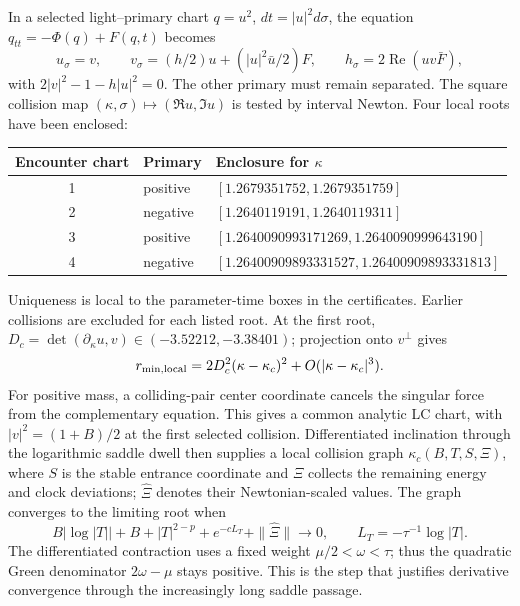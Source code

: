 In a selected light--primary chart $q=u^2$, $dt=|u|^2d\sigma$,
the equation $q_{tt}=-\Phi(q)+F(q,t)$ becomes
\[
 u_\sigma=v,\qquad
 v_\sigma=(h/2)u+(|u|^2\bar u/2)F,\qquad
 h_\sigma=2\operatorname{Re}(uv\bar F),
\]
with $2|v|^2-1-h|u|^2=0$. The other primary must remain separated.
The square collision map $(\kappa,\sigma)\mapsto(\Re u,\Im u)$
is tested by interval Newton. Four local roots have been enclosed:
\begin{center}
\small
\begin{tabular}{cll}
\toprule
Encounter chart & Primary & Enclosure for $\kappa$\\
\midrule
1 & positive & $[1.2679351752,1.2679351759]$\\
2 & negative & $[1.2640119191,1.2640119311]$\\
3 & positive & $[1.2640090993171269,1.2640090999643190]$\\
4 & negative & $[1.26400909893331527,1.26400909893331813]$\\
\bottomrule
\end{tabular}
\end{center}
Uniqueness is local to the parameter-time boxes in the certificates.
Earlier collisions are excluded for each listed root. At the first root,
$D_c=\det(\partial_\kappa u,v)\in(-3.52212,-3.38401)$; projection
onto $v^\perp$ gives
\[
 r_{\min,\rm local}=2D_c^2(\kappa-\kappa_c)^2
 +O(|\kappa-\kappa_c|^3).
\]
For positive mass, a colliding-pair center coordinate cancels the singular
force from the complementary equation. This gives a common analytic LC
chart, with $|v|^2=(1+B)/2$ at the first selected collision. Differentiated
inclination through the logarithmic saddle dwell then supplies a local
collision graph $\kappa_c(B,T,S,\Xi)$, where $S$ is the stable entrance
coordinate and $\Xi$ collects the remaining energy and clock deviations;
$\widehat\Xi$ denotes their Newtonian-scaled values.
The graph converges to the limiting root when
\[
 B|\log|T||+B+|T|^{2-p}+e^{-cL_T}+\|\widehat\Xi\|\to0,
 \qquad L_T=-\tau^{-1}\log|T|.
\]
The differentiated contraction uses a fixed weight
$\mu/2<\omega<\tau$; thus the quadratic Green denominator
$2\omega-\mu$ stays positive. This is the step that justifies derivative
convergence through the increasingly long saddle passage.

